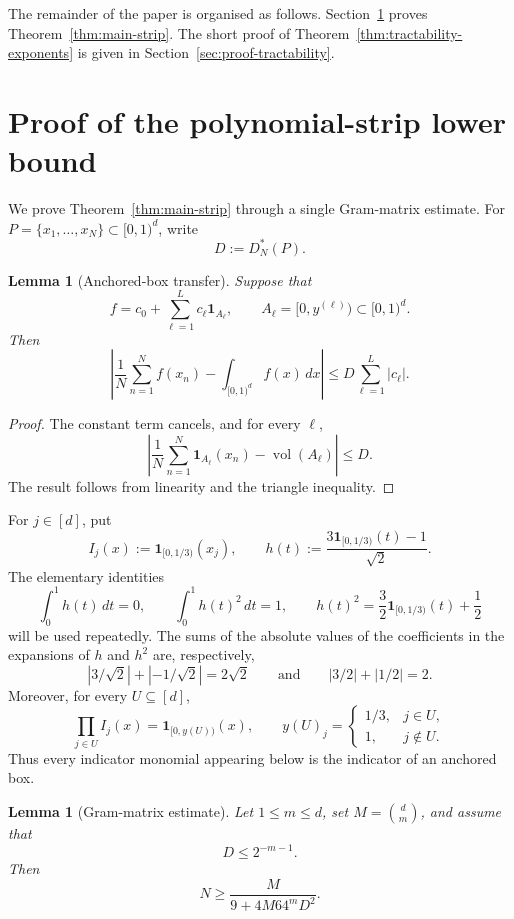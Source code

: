 \documentclass[10pt,a4paper]{amsart}
\newtheorem{lemma}[theorem]{Lemma}
\newcommand{\1}{\mathbf{1}}
\newcommand{\vol}{\operatorname{vol}}
\begin{document}
The remainder of the paper is organised as follows.  Section~\ref{sec:proof-main} proves Theorem~\ref{thm:main-strip}.  The short proof of Theorem~\ref{thm:tractability-exponents} is given in Section~\ref{sec:proof-tractability}.


\section{Proof of the polynomial-strip lower bound}\label{sec:proof-main}

We prove Theorem~\ref{thm:main-strip} through a single Gram-matrix estimate.
For \(P=\{x_1,\dots,x_N\}\subset[0,1)^d\), write
\[
 D:=D_N^\ast(P).
\]

\begin{lemma}[Anchored-box transfer]\label{lem:transfer-short}
Suppose that
\[
 f=c_0+\sum_{\ell=1}^L c_\ell\1_{A_\ell},
 \qquad A_\ell=[0,y^{(\ell)})\subset[0,1)^d.
\]
Then
\[
 \left|
 \frac1N\sum_{n=1}^N f(x_n)
 -\int_{[0,1)^d}f(x)\,dx
 \right|
 \le D\sum_{\ell=1}^L|c_\ell|.
\]
\end{lemma}

\begin{proof}
The constant term cancels, and for every \(\ell\),
\[
 \left|
 \frac1N\sum_{n=1}^N\1_{A_\ell}(x_n)-\vol(A_\ell)
 \right|\le D.
\]
The result follows from linearity and the triangle inequality.
\end{proof}

For \(j\in[d]\), put
\[
 I_j(x):=\1_{[0,1/3)}(x_j),
 \qquad
 h(t):=\frac{3\1_{[0,1/3)}(t)-1}{\sqrt2}.
\]
The elementary identities
\begin{equation}\label{eq:h-short}
 \int_0^1h(t)\,dt=0,\qquad
 \int_0^1h(t)^2\,dt=1,\qquad
 h(t)^2=\frac32\1_{[0,1/3)}(t)+\frac12
\end{equation}
will be used repeatedly.  The sums of the absolute values of the
coefficients in the expansions of \(h\) and \(h^2\) are, respectively,
\[
 | 3/\sqrt{2}| + |-1/\sqrt{2}| = 2\sqrt2
 \qquad\text{and}\qquad
 |3/2| + |1/2| = 2.
\]
Moreover, for every \(U\subseteq[d]\),
\[
 \prod_{j\in U}I_j(x)=\1_{[0,y(U))}(x),
 \qquad
 y(U)_j=
 \begin{cases}
 1/3,&j\in U,\\
 1,&j\notin U.
 \end{cases}
\]
Thus every indicator monomial appearing below is the indicator of an
anchored box.

\begin{lemma}[Gram-matrix estimate]\label{lem:gram-short}
Let \(1\le m\le d\), set \(M=\binom dm\), and assume that
\[
 D\le2^{-m-1}.
\]
Then
\begin{equation*}
 N\ge\frac{M}{9+4M64^mD^2}.
\end{equation*}
\end{lemma}
\end{document}
